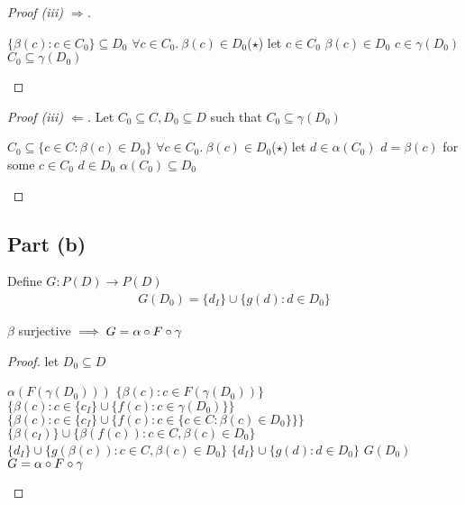 \begin{prop}
\begin{proof}[Proof (iii) $\Rightarrow$]
    \begin{itemize}
      \step[\imps] $\{\beta(c) : c\in C_0\}\subseteq D_0$
      \step[\imps] $\forall c\in C_0.~\beta(c)\in D_0$\hfill($\star$)
      \step let $c\in C_0$
      \step[\imps] $\beta(c)\in D_0$
      \step[\imps] $c\in\gamma(D_0)$
      \step[\imps]$C_0\subseteq\gamma(D_0)$\qedhere
    \end{itemize}
  \end{proof}
  \begin{proof}[Proof (iii) $\Leftarrow$]
    Let $C_0\subseteq C, D_0\subseteq D$ such that $C_0\subseteq\gamma(D_0)$
    \begin{itemize}
      \step[\imps] $C_0\subseteq\{c\in C : \beta(c)\in D_0\}$
      \step[\imps] $\forall c\in C_0.~\beta(c)\in D_0$\hfill($\star$)
      \step let $d\in \alpha(C_0)$
      \step[\imps] $d = \beta(c)$ for some $c\in C_0$
      \step[\imps] $d\in D_0$
      \step[\imps]$\alpha(C_0)\subseteq D_0$\qedhere
    \end{itemize}
  \end{proof}
\end{prop}

\subsection{Part (b)}\label{sec:q-2-b}
Define $G : P(D)\to P(D)$
\begin{align*}
  G(D_0) = \{d_I\}\cup\{g(d) : d\in D_0\}
\end{align*}
\begin{prop}
  $\beta$ surjective $\implies G = \alpha\circ F\circ\gamma$
  \begin{proof}
    let $D_0\subseteq D$
    \begin{itemize}
      \step $\alpha(F(\gamma(D_0)))$
      \step[=] $\{\beta(c):c\in F(\gamma(D_0))\}$
      \step[=] $\{\beta(c):c\in \{c_I\}\cup\{f(c):c\in\gamma(D_0)\}\}$
      \step[=] $\{\beta(c):c\in \{c_I\}\cup\{f(c):c\in\{c\in C:\beta(c)\in D_0\}\}\}$
      \step[=] $\{\beta(c_I)\}\cup\{\beta(f(c)) : c\in C,\beta(c)\in D_0\}$
      \step[=] $\{d_I\}\cup\{g(\beta(c)) : c\in C,\beta(c)\in D_0\}$
      \step[=] $\{d_I\}\cup\{g(d):d\in D_0\}$
      \step[=] $G(D_0)$
      \step[\imps] $G = \alpha\circ F\circ\gamma$\qedhere
    \end{itemize}
  \end{proof}
\end{prop}

